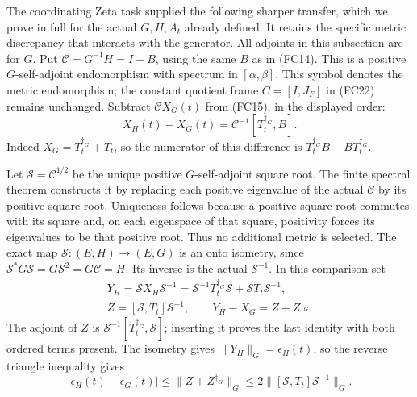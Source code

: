 \documentclass{article}
\begin{document}
The coordinating Zeta task supplied the following sharper transfer,
which we prove in full for the actual $G,H,A_t$ already defined.
It retains the specific metric discrepancy that interacts with the
generator. All adjoints in this subsection are for $G$.
Put $\mathcal C=G^{-1}H=I+B$, using the same $B$ as in (FC14).
This is a positive $G$-self-adjoint endomorphism with spectrum in
$[\alpha,\beta]$. This symbol denotes the metric endomorphism;
the constant quotient frame $C=[I,J_F]$ in (FC22) remains unchanged.
Subtract $\mathcal C X_G(t)$ from (FC15), in the displayed order:
\[
 \boxed{X_H(t)-X_G(t)
       =\mathcal C^{-1}[T_t^{\dagger_G},B].}
 \tag{FC24}
\]
Indeed $X_G=T_t^{\dagger_G}+T_t$, so the numerator of this
difference is $T_t^{\dagger_G}B-BT_t^{\dagger_G}$.

Let $\mathcal S=\mathcal C^{1/2}$ be the unique positive
$G$-self-adjoint square root. The finite spectral theorem constructs
it by replacing each positive eigenvalue of the actual $\mathcal C$
by its positive square root. Uniqueness follows because a positive
square root commutes with its square and, on each eigenspace of that
square, positivity forces its eigenvalues to be that positive root.
Thus no additional metric is selected. The exact map
$\mathcal S:(E,H)\to(E,G)$ is an onto isometry, since
$\mathcal S^*G\mathcal S=G\mathcal S^2=G\mathcal C=H$.
Its inverse is the actual $\mathcal S^{-1}$.
In this comparison set
\[
\begin{gathered}
 Y_H=\mathcal S X_H\mathcal S^{-1}
       =\mathcal S^{-1}T_t^{\dagger_G}\mathcal S
                       +\mathcal S T_t\mathcal S^{-1},\\
 Z=[\mathcal S,T_t]\mathcal S^{-1},\qquad
 Y_H-X_G=Z+Z^{\dagger_G}.
\end{gathered}\tag{FC25}
\]
The adjoint of $Z$ is
$\mathcal S^{-1}[T_t^{\dagger_G},\mathcal S]$; inserting it
proves the last identity with both ordered terms present.
The isometry gives $\|Y_H\|_G=\epsilon_H(t)$, so the reverse
triangle inequality gives
\[
 |\epsilon_H(t)-\epsilon_G(t)|
 \le\|Z+Z^{\dagger_G}\|_G
 \le2\|[\mathcal S,T_t]\mathcal S^{-1}\|_G.
 \tag{FC26}
\]
\end{document}
